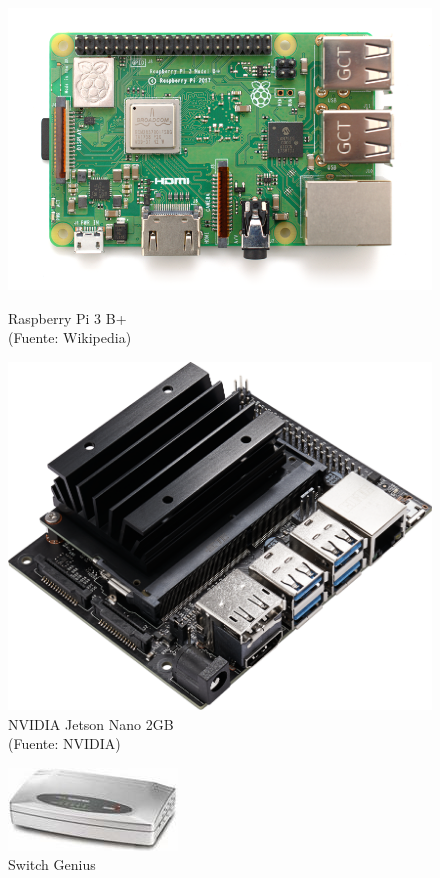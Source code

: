 \begin{figure}[H]
    \begin{minipage}[t]{0.49\linewidth}  %
        \centering
        \includegraphics[height=0.1\textheight]{Figuras/Raspberry_Pi_3_B+.png}
        \caption{Raspberry Pi 3 B+ \\ (Fuente: Wikipedia\autocite{ArchivoRaspberryPi})} 
        \label{fig:RaspBerrryBPlus}
    \end{minipage}
    \hfill
    \begin{minipage}[t]{0.5\linewidth}  %
        \centering
        \includegraphics[height=0.1\textheight]{Figuras/nvidia_jetson_nano_2GB.png}    
        \caption{NVIDIA Jetson Nano 2GB \\ (Fuente: NVIDIA\autocite{JetsonNano})} 
        \label{fig:JetsonNano2GB}
    \end{minipage}
\end{figure}
\begin{figure}[H]
    \centering
    \includegraphics[height=0.1\textheight]{Figuras/genius_switch.jpg}    
    \caption{Switch Genius} 
    \label{fig:Switch}
\end{figure}
\newpage

